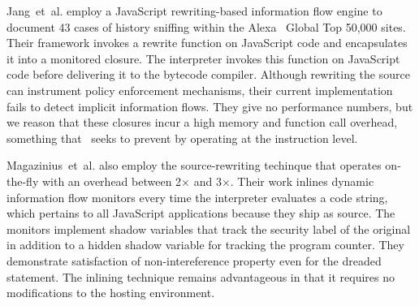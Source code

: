 Jang~et~al.\cite{jang.etal+10} employ a JavaScript rewriting-based information flow engine to document 43 cases of history sniffing within the Alexa~\cite{alexa} Global Top 50,000 sites.
Their framework invokes a rewrite function on JavaScript code and encapsulates it into a monitored closure.
The interpreter invokes this function on JavaScript code before delivering it to the bytecode compiler.
Although rewriting the source can instrument policy enforcement mechanisms, their current implementation fails to detect implicit information flows.
They give no performance numbers, but we reason that these closures incur a high memory and function call overhead, something that \JitFlow\ seeks to prevent by operating at the instruction level.


Magazinius~et~al.\cite{magazinius.etal+12} also employ the source-rewriting techinque that operates on-the-fly with an overhead between 2$\times$ and 3$\times$.
Their work inlines dynamic information flow monitors every time the interpreter evaluates a code string, which pertains to all JavaScript applications because they ship as source.
The monitors implement shadow variables that track the security label of the original in addition to a hidden shadow variable for tracking the program counter.
They demonstrate satisfaction of non-intereference property even for the dreaded  statement.
The inlining technique remains advantageous in that it requires no modifications to the hosting environment.

